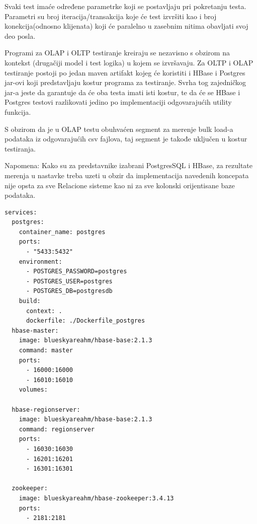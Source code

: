 \documentclass[12pt,oneside]{memoir}
\begin{document}
Svaki test imaće određene parametrke koji se postavljaju pri pokretanju testa. Parametri su broj iteracija/transakcija koje će test izvršiti kao i broj konekcija(odnosno klijenata) koji će paralelno u zasebnim nitima obavljati svoj deo posla.

Programi za OLAP i OLTP testiranje kreiraju se nezavisno s obzirom na kontekst (drugačiji model i test logika) u kojem se izvršavaju. Za OLTP i OLAP testiranje postoji po jedan maven artifakt kojeg će koristiti i HBase i Postgres jar-ovi koji predstavljaju kostur programa za testiranje. Svrha tog zajedničkog jar-a jeste da garantuje da će oba testa imati isti kostur, te da će se HBase i Postgres testovi razlikovati jedino po implementaciji  odgovarajućih utility funkcija. 


S obzirom da je u OLAP testu obuhvaćen segment za merenje bulk load-a podataka iz odgovarajućih csv fajlova, taj segment je takođe uključen u kostur testiranja.

Napomena: Kako su za predstavnike izabrani PostgresSQL i HBase,  za rezultate merenja u nastavke treba uzeti u obzir da implementacija navedenih koncepata nije opsta za sve Relacione sisteme kao ni za sve kolonski orijentisane baze podataka.



\begin{lstlisting}[title={docker-compose.yml},captionpos=t]
services: 
  postgres:
    container_name: postgres
    ports:
      - "5433:5432"
    environment:
      - POSTGRES_PASSWORD=postgres
      - POSTGRES_USER=postgres
      - POSTGRES_DB=postgresdb
    build:
      context: .
      dockerfile: ./Dockerfile_postgres
  hbase-master:
    image: blueskyareahm/hbase-base:2.1.3
    command: master
    ports:
      - 16000:16000
      - 16010:16010
    volumes:

  hbase-regionserver:
    image: blueskyareahm/hbase-base:2.1.3
    command: regionserver
    ports:
      - 16030:16030
      - 16201:16201
      - 16301:16301

  zookeeper:
    image: blueskyareahm/hbase-zookeeper:3.4.13
    ports:
      - 2181:2181
\end{lstlisting}


\end{document}
